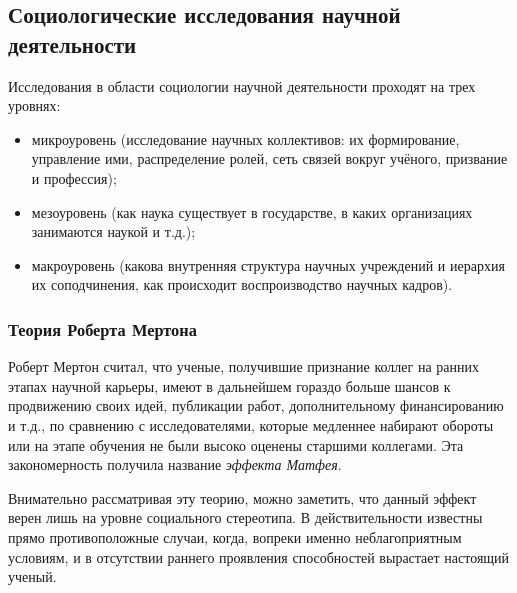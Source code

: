 
\subsection{Социологические исследования научной деятельности}

Исследования в области социологии научной деятельности проходят на трех уровнях:
\begin{itemize}
    \item микроуровень (исследование научных коллективов: их формирование,
    управление ими, распределение ролей, сеть связей вокруг учёного, призвание и профессия);
    \item мезоуровень (как наука существует в государстве, в каких организациях занимаются наукой и т.д.);
    \item макроуровень (какова внутренняя структура научных учреждений и иерархия их соподчинения, как происходит воспроизводство научных кадров).
\end{itemize}

\subsubsection{Теория Роберта Мертона} 

Роберт Мертон считал, что ученые, получившие
признание коллег на ранних этапах научной карьеры, имеют в дальнейшем гораздо
больше шансов к продвижению своих идей, публикации работ, дополнительному
финансированию и т.д., по сравнению с исследователями, которые медленнее
набирают обороты или на этапе обучения не были высоко оценены старшими
коллегами. Эта закономерность получила название \textit{эффекта Матфея}.

Внимательно рассматривая эту теорию, можно заметить, что данный эффект верен лишь на
уровне социального стереотипа. 
В действительности известны прямо противоположные случаи, когда,
вопреки именно неблагоприятным условиям, и в отсутствии раннего проявления
способностей вырастает настоящий ученый.

